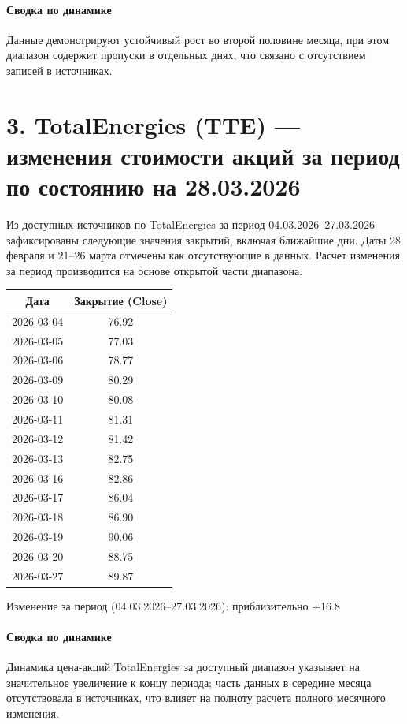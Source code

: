 \documentclass[12pt]{article}
\begin{document}
\paragraph*{Сводка по динамике}
Данные демонстрируют устойчивый рост во второй половине месяца, при этом диапазон содержит пропуски в отдельных днях, что связано с отсутствием записей в источниках.

\section*{3. TotalEnergies (TTE) — изменения стоимости акций за период по состоянию на 28.03.2026}
Из доступных источников по TotalEnergies за период 04.03.2026–27.03.2026 зафиксированы следующие значения закрытий, включая ближайшие дни. Даты 28 февраля и 21–26 марта отмечены как отсутствующие в данных. Расчет изменения за период производится на основе открытой части диапазона.

\begin{center}
\begin{tabular}{|c|c|}
\hline
Дата & Закрытие (Close) \\
\hline
2026-03-04 & 76.92 \\
2026-03-05 & 77.03 \\
2026-03-06 & 78.77 \\
2026-03-09 & 80.29 \\
2026-03-10 & 80.08 \\
2026-03-11 & 81.31 \\
2026-03-12 & 81.42 \\
2026-03-13 & 82.75 \\
2026-03-16 & 82.86 \\
2026-03-17 & 86.04 \\
2026-03-18 & 86.90 \\
2026-03-19 & 90.06 \\
2026-03-20 & 88.75 \\
2026-03-27 & 89.87 \\
\hline
\end{tabular}
\end{center}

Изменение за период (04.03.2026–27.03.2026): приблизительно +16.8%

\paragraph*{Сводка по динамике}
Динамика цена-акций TotalEnergies за доступный диапазон указывает на значительное увеличение к концу периода; часть данных в середине месяца отсутствовала в источниках, что влияет на полноту расчета полного месячного изменения.
\end{document}
